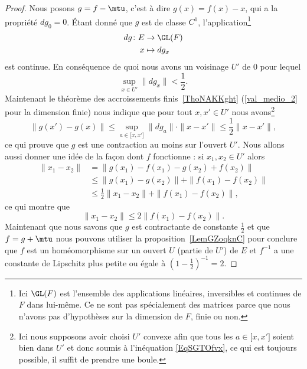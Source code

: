 \begin{proof}
Nous posons \( g=f-\mtu\), c'est à dire \( g(x)=f(x)-x\), qui a la propriété \( dg_0=0\). Étant donné que \( g\) est de classe \( C^1\), l'application\footnote{Ici \( \GL(F)\) est l'ensemble des applications linéaires, inversibles et continues de \( F\) dans lui-même. Ce ne sont pas spécialement des matrices parce que nous n'avons pas d'hypothèses sur la dimension de \( F\), finie ou non.}
    \begin{equation}
        \begin{aligned}
            dg\colon E&\to \GL(F) \\
            x&\mapsto dg_x
        \end{aligned}
    \end{equation}
    est continue. En conséquence de quoi nous avons un voisinage \( U'\) de \( 0 \) pour lequel
    \begin{equation}    \label{EqSGTOfvx}
        \sup_{x\in U'}\| dg_x \|<\frac{ 1 }{2}.
    \end{equation}
    Maintenant le théorème des accroissements finis~\ref{ThoNAKKght} (\ref{val_medio_2} pour la dimension finie) nous indique que pour tout \( x,x'\in U'\) nous avons\footnote{Ici nous supposons avoir choisi \( U'\) convexe afin que tous les \( a\in \mathopen[ x , x' \mathclose]\) soient bien dans \( U'\) et donc soumis à l'inéquation \eqref{EqSGTOfvx}, ce qui est toujours possible, il suffit de prendre une boule.}
    \begin{equation}
        \| g(x')-g(x) \|\leq \sup_{a\in\mathopen[ x , x' \mathclose]}\| dg_a \| \cdot \| x-x' \|\leq \frac{ 1 }{2}\| x-x' \|,
    \end{equation}
    ce qui prouve que \( g\) est une contraction au moins sur l'ouvert \( U'\). Nous allons aussi donner une idée de la façon dont \( f\) fonctionne : si \( x_1,x_2\in U'\) alors
    \begin{subequations}
        \begin{align}
            \| x_1-x_2 \|&=\| g(x_1)-f(x_1)-g(x_2)+f(x_2) \| \\
            &\leq \| g(x_1)-g(x_2) \|+\| f(x_1)-f(x_2) \|\\
            &\leq \frac{ 1 }{2}\| x_1-x_2 \|+\| f(x_1)-f(x_2) \|,
        \end{align}
    \end{subequations}
    ce qui montre que
    \begin{equation}
        \| x_1-x_2 \|\leq 2\| f(x_1)-f(x_2) \|.
    \end{equation}
    Maintenant que nous savons que \( g\) est contractante de constante \( \frac{ 1 }{2}\) et que \( f=g+\mtu\) nous pouvons utiliser la proposition~\ref{LemGZoqknC} pour conclure que \( f\) est un homéomorphisme sur un ouvert \( U\) (partie de \( U'\)) de \( E\) et \( f^{-1}\) a une constante de Lipschitz plus petite ou égale à \( (1-\frac{ 1 }{2})^{-1}=2\).


\end{proof}

